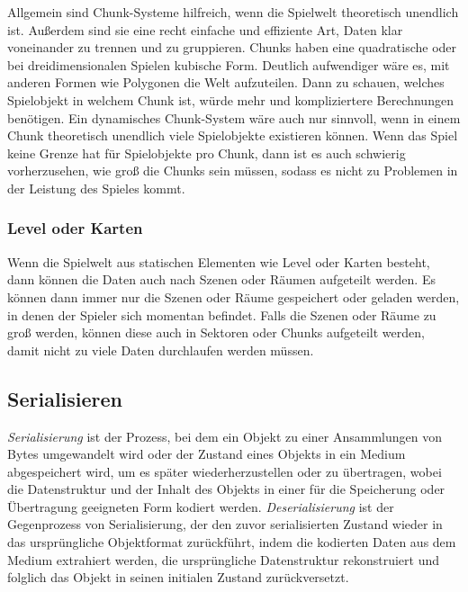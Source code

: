 Allgemein sind Chunk-Systeme hilfreich, wenn die Spielwelt theoretisch unendlich ist. Außerdem sind sie eine recht einfache und effiziente Art, Daten klar voneinander zu trennen und zu gruppieren. Chunks haben eine quadratische oder bei dreidimensionalen Spielen kubische Form. Deutlich aufwendiger wäre es, mit anderen Formen wie Polygonen die Welt aufzuteilen. Dann zu schauen, welches Spielobjekt in welchem Chunk ist, würde mehr und kompliziertere Berechnungen benötigen. Ein dynamisches Chunk-System wäre auch nur sinnvoll, wenn in einem Chunk theoretisch unendlich viele Spielobjekte existieren können. Wenn das Spiel keine Grenze hat für Spielobjekte pro Chunk, dann ist es auch schwierig vorherzusehen, wie groß die Chunks sein müssen, sodass es nicht zu Problemen in der Leistung des Spieles kommt. 

\subsubsection{Level oder Karten}
Wenn die Spielwelt aus statischen Elementen wie Level oder Karten besteht, dann können die Daten auch nach Szenen oder Räumen aufgeteilt werden. Es können dann immer nur die Szenen oder Räume gespeichert oder geladen werden, in denen der Spieler sich momentan befindet. Falls die Szenen oder Räume zu groß werden, können diese auch in Sektoren oder Chunks aufgeteilt werden, damit nicht zu viele Daten durchlaufen werden müssen.    


\subsection{Serialisieren}

\textit{Serialisierung} ist der Prozess, bei dem ein Objekt zu einer Ansammlungen von Bytes umgewandelt wird oder der Zustand eines Objekts in ein Medium abgespeichert wird, um es später wiederherzustellen oder zu übertragen, wobei die Datenstruktur und der Inhalt des Objekts in einer für die Speicherung oder Übertragung geeigneten Form kodiert werden. \textit{Deserialisierung} ist der Gegenprozess von Serialisierung, der den zuvor serialisierten Zustand wieder in das ursprüngliche Objektformat zurückführt, indem die kodierten Daten aus dem Medium extrahiert werden, die ursprüngliche Datenstruktur rekonstruiert und folglich das Objekt in seinen initialen Zustand zurückversetzt.\cite{codeguruWorkingWith}

